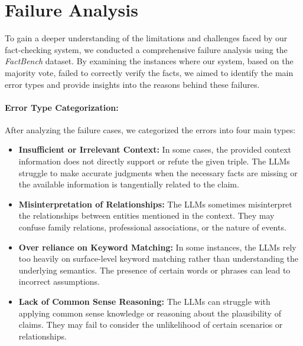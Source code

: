 %

\section{Failure Analysis}\label{sec:faiure-analysis}
To gain a deeper understanding of the limitations and challenges faced by our fact-checking system, we conducted a comprehensive failure analysis using the \textit{FactBench} dataset.
By examining the instances where our system, based on the majority vote, failed to correctly verify the facts, we aimed to identify the main error types and provide insights into the reasons behind these failures.
\paragraph{Error Type Categorization:}
After analyzing the failure cases, we categorized the errors into four main types:
\begin{itemize}
    \item \textbf{Insufficient or Irrelevant Context:} In some cases, the provided context information does not directly support or refute the given triple. The LLMs struggle to make accurate judgments when the necessary facts are missing or the available information is tangentially related to the claim.
    \item \textbf{Misinterpretation of Relationships:} The LLMs sometimes misinterpret the relationships between entities mentioned in the context. They may confuse family relations, professional associations, or the nature of events.
    \item \textbf{Over reliance on Keyword Matching:} In some instances, the LLMs rely too heavily on surface-level keyword matching rather than understanding the underlying semantics. The presence of certain words or phrases can lead to incorrect assumptions.
    \item \textbf{Lack of Common Sense Reasoning:} The LLMs can struggle with applying common sense knowledge or reasoning about the plausibility of claims. They may fail to consider the unlikelihood of certain scenarios or relationships.
\end{itemize}

